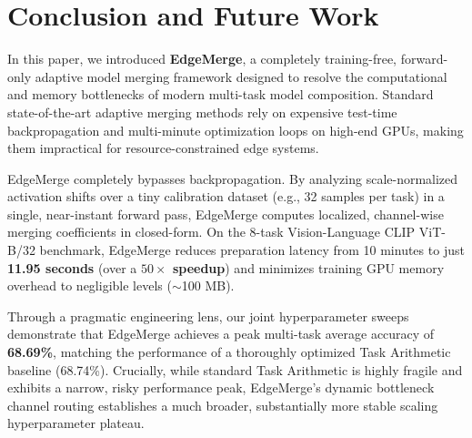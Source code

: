 \section{Conclusion and Future Work}
\label{sec:conclusion}

In this paper, we introduced \textbf{EdgeMerge}, a completely training-free, forward-only adaptive model merging framework designed to resolve the computational and memory bottlenecks of modern multi-task model composition. Standard state-of-the-art adaptive merging methods rely on expensive test-time backpropagation and multi-minute optimization loops on high-end GPUs, making them impractical for resource-constrained edge systems.

EdgeMerge completely bypasses backpropagation. By analyzing scale-normalized activation shifts over a tiny calibration dataset (e.g., 32 samples per task) in a single, near-instant forward pass, EdgeMerge computes localized, channel-wise merging coefficients in closed-form. On the 8-task Vision-Language CLIP ViT-B/32 benchmark, EdgeMerge reduces preparation latency from 10 minutes to just \textbf{11.95 seconds} (over a \textbf{$50\times$ speedup}) and minimizes training GPU memory overhead to negligible levels ($\sim$100 MB).

Through a pragmatic engineering lens, our joint hyperparameter sweeps demonstrate that EdgeMerge achieves a peak multi-task average accuracy of \textbf{68.69\%}, matching the performance of a thoroughly optimized Task Arithmetic baseline (68.74\%). Crucially, while standard Task Arithmetic is highly fragile and exhibits a narrow, risky performance peak, EdgeMerge's dynamic bottleneck channel routing establishes a much broader, substantially more stable scaling hyperparameter plateau.

